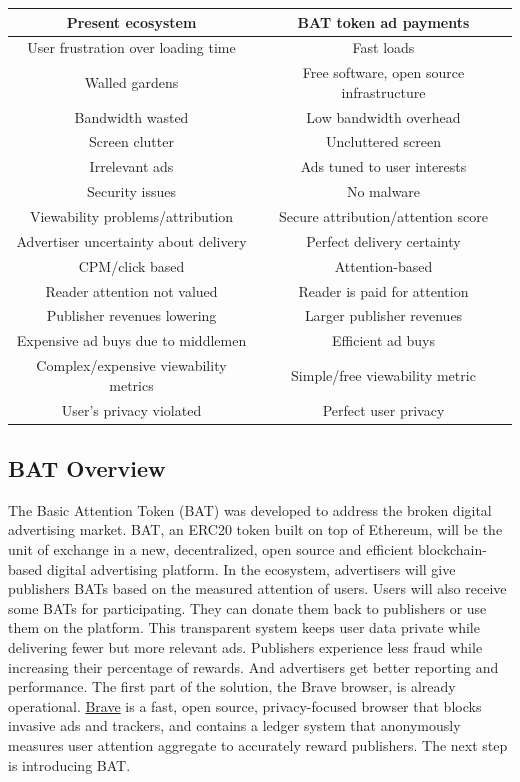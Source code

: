 \documentclass[11pt]{article}
\begin{document}
\begin{tabu}  to  \textwidth {|c|c|} \hline

{\textbf{Present ecosystem}} & {\textbf{\textrm{BAT} token ad payments}} \\  \hline

User frustration over loading time & Fast loads\\ %
Walled gardens & Free software, open source infrastructure\\ %
Bandwidth wasted & Low bandwidth overhead\\ %
Screen clutter & Uncluttered screen \\ %
Irrelevant ads & Ads tuned to user interests \\ %
Security issues & No malware \\ %
Viewability problems/attribution & Secure attribution/attention score\\ %
Advertiser uncertainty about delivery & Perfect delivery certainty \\ %
CPM/click based & Attention-based \\ %
Reader attention not valued & Reader is paid for attention \\ %
Publisher revenues lowering & Larger publisher revenues \\ %
Expensive ad buys due to middlemen & Efficient ad buys \\ %
Complex/expensive viewability metrics & Simple/free viewability metric \\ %
User's privacy violated & Perfect user privacy \\ \hline
\end{tabu}


\subsection{\textrm{BAT} Overview}
\label{sec-5-3}


The Basic Attention Token (\textrm{BAT}) was developed to address the broken digital advertising market. \textrm{BAT}, an ERC20 token built on top of Ethereum, will be the unit of exchange in a new, decentralized, open source and efficient blockchain-based digital advertising platform. In the ecosystem, advertisers will give publishers \textrm{BAT}s based on the measured attention of users. Users will also receive some \textrm{BAT}s for participating. They can donate them back to publishers or use them on the platform. This transparent system keeps user data private while delivering fewer but more relevant ads. Publishers experience less fraud while increasing their percentage of rewards. And advertisers get better reporting and performance. The first part of the solution, the Brave browser, is already operational. \href{https://brave.com/}{Brave} is a fast, open source, privacy-focused browser that blocks invasive ads and trackers, and contains a ledger system that anonymously measures user attention aggregate to accurately reward publishers. The next step is introducing \textrm{BAT}.
\end{document}
